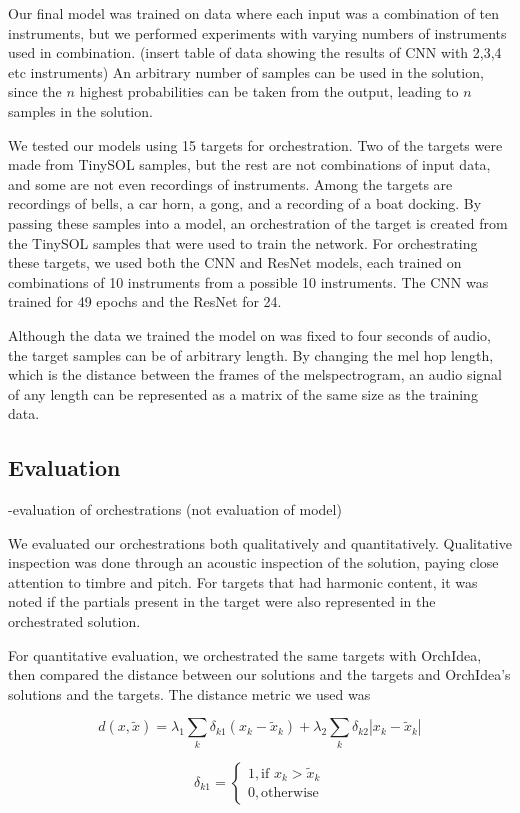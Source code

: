 \documentclass{article}
\begin{document}
Our final model was trained on data where each input was a combination of ten instruments, but we performed experiments with varying numbers of instruments used in combination. (insert table of data showing the results of CNN with 2,3,4 etc instruments) An arbitrary number of samples can be used in the solution, since the $n$ highest probabilities can be taken from the output, leading to $n$ samples in the solution.

We tested our models using 15 targets for orchestration. Two of the targets were made from TinySOL samples, but the rest are not combinations of input data, and some are not even recordings of instruments. Among the targets are recordings of bells, a car horn, a gong, and a recording of a boat docking. By passing these samples into a model, an orchestration of the target is created from the TinySOL samples that were used to train the network. For orchestrating these targets, we used both the CNN and ResNet models, each trained on combinations of 10 instruments from a possible 10 instruments. The CNN was trained for 49 epochs and the ResNet for 24.

Although the data we trained the model on was fixed to four seconds of audio, the target samples can be of arbitrary length. By changing the mel hop length, which is the distance between the frames of the melspectrogram, an audio signal of any length can be represented as a matrix of the same size as the training data.

\subsection{Evaluation}
-evaluation of orchestrations (not evaluation of model)

We evaluated our orchestrations both qualitatively and quantitatively. Qualitative inspection was done through an acoustic inspection of the solution, paying close attention to timbre and pitch. For targets that had harmonic content, it was noted if the partials present in the target were also represented in the orchestrated solution.

For quantitative evaluation, we orchestrated the same targets with OrchIdea, then compared the distance between our solutions and the targets and OrchIdea's solutions and the targets. The distance metric we used was 

$$d(x, \tilde{x}) =\lambda_1 \sum_k \delta_{k1}(x_k - \tilde{x}_k) + \lambda_2 \sum_k \delta_{k2}|x_k - \tilde{x	}_k|$$

$$\delta_{k1} = 
\begin{cases}
1, \text{if   } x_k > \tilde{x}_k \\
0, \text{otherwise}
\end{cases} $$
\end{document}
